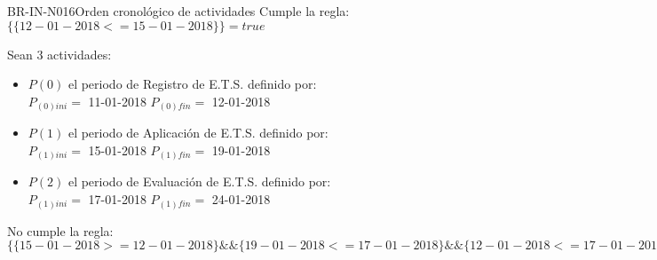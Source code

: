 \begin{BusinessRule}{BR-IN-N016}{Orden cronológico de actividades}
	Cumple la regla:
	$ \{ \{12-01-2018 <= 15-01-2018\}
	\} = true$
	
	Sean 3 actividades:
	\begin{itemize}
		\item $P(0)$ el periodo de Registro de E.T.S. definido por: \\
		$P_{(0)ini}=$ 11-01-2018
		$P_{(0)fin}=$ 12-01-2018 \\
		\item $P(1)$ el periodo de Aplicación de E.T.S. definido por:\\
		$P_{(1)ini}=$ 15-01-2018
		$P_{(1)fin}=$ 19-01-2018 \\
		\item $P(2)$ el periodo de Evaluación de E.T.S. definido por:\\
		$P_{(1)ini}=$ 17-01-2018
		$P_{(1)fin}=$ 24-01-2018 \\
	\end{itemize} 
	
	No cumple la regla:
	$ \{ \{15-01-2018 >= 12-01-2018\} \&\& \{19-01-2018 <= 17-01-2018\} \&\& \{12-01-2018 <= 17-01-2018\}
	\} = true$
\end{BusinessRule}

